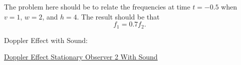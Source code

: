 \documentclass{ximera}
\begin{document}
\begin{example}
The problem here should be to relate the frequencies at time $t=-0.5$ when $v=1$, $w=2$, and $h=4$. The result should be that 
\[
    f_1 = 0.7 f_2 . 
\]




Doppler Effect with Sound:

\begin{onlineOnly}
    \begin{center}
\end{center}
\end{onlineOnly}

\href{https://www.desmos.com/calculator/gxzmjpgkrr}{Doppler Effect Stationary Observer 2 With Sound}


\end{example}
\end{document}
